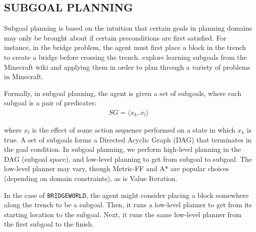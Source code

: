 \documentclass[]{article}
\newcommand{\stnote}[1]{\textcolor{Blue}{\textbf{ST: #1}}}
\begin{document}



\subsection{SUBGOAL PLANNING}
\label{sec:subgoals}

Subgoal planning is based on the intuition that certain goals in
planning domains may only be brought about if certain preconditions
are first satisfied. For instance, in the bridge problem, the agent must
first place a block in the trench to create a bridge before crossing
the trench.  \citet{branavan12a} explore learning subgoals from the
Minecraft wiki and applying them in order to plan through a variety of
problems in Minecraft.

Formally, in subgoal planning, the agent is given a set of subgoals, where each subgoal is a pair of predicates:
\begin{align}
SG = \langle x_k, x_l \rangle
\end{align}


where $x_l$ is the effect of some action sequence performed on 
a state in which $x_k$ is true. A set of subgoals forms a Directed Acyclic Graph (DAG)
that terminates in the goal condition. In subgoal planning, we perform high-level planning
in the DAG (subgoal space), and low-level planning to get from subgoal to subgoal. 
The low-level planner may vary, though Metric-FF and A* are popular choices 
(depending on domain constraints), as is Value Iteration.

In the case of \texttt{BRIDGEWORLD}, the agent might consider placing
a block somewhere along the trench to be a subgoal. Then, it runs
a low-level planner to get from its starting location to the subgoal.
Next, it runs the same low-level planner from the first subgoal to the finish.
\end{document}
